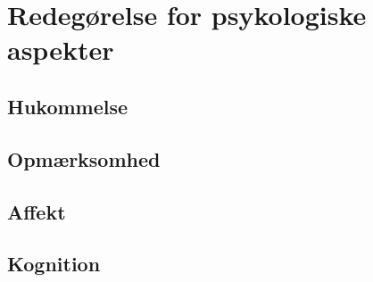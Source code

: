 \section{Redegørelse for psykologiske aspekter}



\subsection{Hukommelse}


\subsection{Opmærksomhed}


\subsection{Affekt}


\subsection{Kognition}



